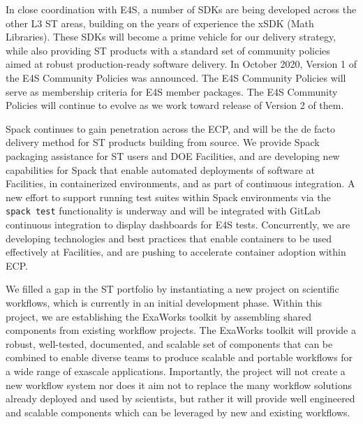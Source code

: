 In close coordination with E4S, a number of SDKs are being developed across the other L3 ST areas, building on the years of experience the xSDK (Math Libraries).  These SDKs will become a prime vehicle for our delivery strategy, while also providing ST products with a standard set of community policies aimed at robust production-ready software delivery.  In October 2020, Version 1 of the E4S Community Policies was announced. The E4S Community Policies will serve as membership criteria for E4S member packages.  The E4S Community Policies will continue to evolve as we work toward release of Version 2 of them.

Spack continues to gain penetration across the ECP, and will be the de facto delivery method for ST products building from source. We provide Spack packaging assistance for ST users and DOE Facilities, and are developing new capabilities for Spack that enable automated deployments of software at Facilities, in containerized environments, and as part of continuous integration. A new effort to support running test suites within Spack environments via the {\tt spack test} functionality is underway and will be integrated with GitLab continuous integration to display dashboards for E4S tests.  Concurrently, we are developing technologies and best practices that enable containers to be used effectively at Facilities, and are pushing to accelerate container adoption within ECP.  

We filled a gap in the ST portfolio by instantiating a new project on scientific workflows, which is currently in an initial development phase.  Within this project, we are establishing the ExaWorks toolkit by assembling shared components from existing workflow projects. The ExaWorks toolkit will provide a robust, well-tested, documented, and scalable set of components that can be combined to enable diverse teams to produce scalable and portable workflows for a wide range of exascale applications. Importantly, the project will not create a new workflow system nor does it aim not to replace the many workflow solutions already deployed and used by scientists, but rather it will provide well engineered and scalable components which can be leveraged by new and existing workflows.

